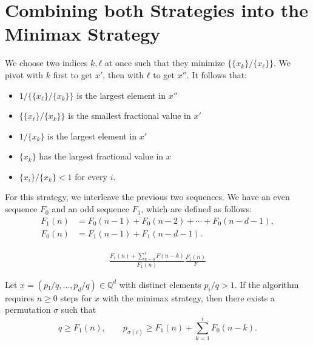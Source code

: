 \section{Combining both Strategies into the Minimax Strategy}

We choose two indices $k, ℓ$ at once such that they minimize $\{\{x_k\}/\{x_ℓ\}\}$.
We pivot with $k$ first to get $x'$, then with $ℓ$ to get $x''$.
It follows that:

\begin{itemize}
  \item $1/\{\{x_ℓ\}/\{x_k\}\}$ is the largest element in $x''$
  \item $\{\{x_ℓ\}/\{x_k\}\}$ is the smallest fractional value in $x'$
  \item $1/\{x_k\}$ is the largest element in $x'$
  \item $\{x_k\}$ has the largest fractional value in $x$
  \item $\{x_i\}/\{x_k\} < 1$ for every $i$.
\end{itemize}

For this strategy, we interleave the previous two sequences.
We have an even sequence $F_0$ and an odd sequence $F_1$,
which are defined as follows:
\begin{align*}
  F_1(n) & = F_0(n-1) + F_0(n-2) + ⋯ + F_0(n-d-1), \\
  F_0(n) & = F_1(n-1) + F_1(n-d-1).
\end{align*}

\begin{align*}
  \frac{F_1(n) + ∑_{k=0}^i F(n - k)}{F_1(n)}
  \frac{F_1(n)}{F}
\end{align*}

\begin{theorem}
  Let $x = (p₁/q, …, p_d/q) ∈ ℚ^d$ with distinct elements $p_i/q > 1$.
  If the algorithm requires $n ≥ 0$ steps for $x$ with the minimax strategy,
  then there exists a permutation $σ$ such that
  \[
    q ≥ F_1(n),
    \qquad
    p_{σ(i)} ≥ F_1(n) + \sum_{k=1}^i F_0(n - k).
  \]
\end{theorem}

